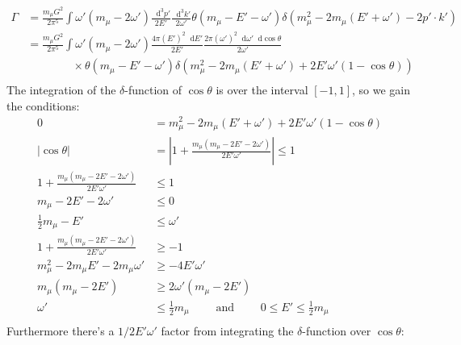 \documentclass[12pt]{article}
\newcommand{\diff}{\mathop{}\!\mathrm{d}}
\theoremstyle{definition}
\begin{document}
\begin{equation*}
\begin{split}
    \Gamma
        &= \frac{m_\mu G^2}{2\pi^5} \int \omega'(m_\mu - 2\omega') \frac{\diff^3 p'}{2E'} \frac{\diff^3 k'}{2\omega'} \theta(m_\mu - E' - \omega') \delta\left(m_\mu^2 - 2m_\mu (E' + \omega') -2 p' \cdot k'\right) \\
        &= \frac{m_\mu G^2}{2\pi^5} \int \omega'(m_\mu - 2\omega') \frac{4\pi (E')^2 \diff E'}{2E'} \frac{2\pi (\omega')^2 \diff\omega' \diff \cos\theta}{2\omega'} \\
        &\qquad \qquad \times \theta(m_\mu - E' - \omega') \delta\left(m_\mu^2 - 2m_\mu (E' + \omega') + 2E'\omega'(1-\cos\theta)\right) \\
\end{split}
\end{equation*}
The integration of the $\delta$-function of $\cos\theta$ is over the interval $[-1,1]$, so we gain the
conditions:
\begin{equation*}
\begin{split}
    0 &= m_\mu^2 - 2m_\mu (E' + \omega') + 2E'\omega'(1 - \cos\theta) \\
    |\cos\theta| &= \left| 1 + \frac{m_\mu (m_\mu - 2E' - 2\omega')}{2E'\omega'} \right| \leq 1 \\
    1 + \frac{m_\mu (m_\mu - 2E' - 2\omega')}{2E'\omega'} &\leq 1 \\
    m_\mu - 2E' - 2\omega' &\leq 0 \\
    \frac{1}{2} m_\mu - E' &\leq \omega' \\
    1 + \frac{m_\mu(m_\mu - 2E' - 2\omega')}{2E'\omega'} &\geq -1 \\
    m_\mu^2 - 2m_\mu E' - 2m_\mu \omega' &\geq -4E'\omega' \\
    m_\mu(m_\mu - 2E') &\geq 2\omega'(m_\mu - 2E') \\
    \omega' &\leq \frac{1}{2} m_\mu \qquad \text{ and } \qquad 0 \leq E' \leq \frac{1}{2} m_\mu \\
\end{split}
\end{equation*}
Furthermore there's a $1/2E'\omega'$ factor from integrating the $\delta$-function over $\cos\theta$:
\end{document}
